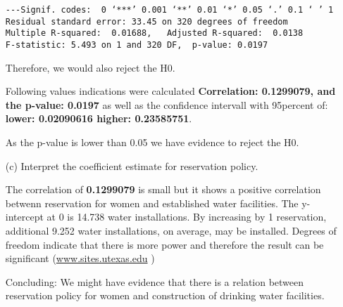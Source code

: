 \documentclass[12pt,letterpaper]{article}
\begin{document}
\begin{enumerate}
\begin{verbatim}
---Signif. codes:  0 ‘***’ 0.001 ‘**’ 0.01 ‘*’ 0.05 ‘.’ 0.1 ‘ ’ 1
Residual standard error: 33.45 on 320 degrees of freedom
Multiple R-squared:  0.01688,	Adjusted R-squared:  0.0138 
F-statistic: 5.493 on 1 and 320 DF,  p-value: 0.0197
\end{verbatim}
Therefore, we would also reject the H0.

Following values indications were calculated  \textbf{Correlation: 0.1299079, and the p-value: 0.0197} as well as the confidence intervall with 95percent of: \textbf{lower:  0.02090616 higher: 0.23585751}. \\
\begin{center}
As the p-value is lower than 0.05 we have evidence to reject the H0.
\end{center}

	\vspace{.5cm}
	\item [(c)] Interpret the coefficient estimate for reservation policy. 
	
	The correlation of \textbf{0.1299079} is small but it shows a positive correlation betwenn reservation for women and established water facilities. The y-intercept at 0 is 14.738 water installations. By increasing by 1 reservation, additional 9.252 water installations, on average, may be installed. Degrees of freedom indicate that there is more power and therefore the result can be significant (\href{	https://sites.utexas.edu/sos/degreesfreedom/#:~:text=Because%20higher%20degrees%20of%20freedom,and%20find%20a%20significant%20result.}{www.sites.utexas.edu} )
	
	Concluding: We might have evidence that there is a relation between reservation policy for women and construction of drinking water facilities.
	

	
\end{enumerate}
\end{document}
